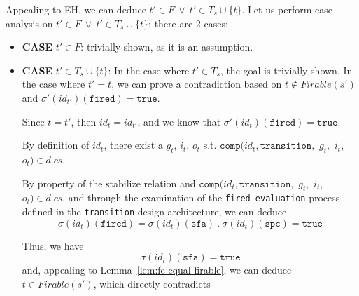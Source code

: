 \documentclass[dvipsnames,12pt]{article}
\begin{document}
\begin{niproof}
\begin{itemize}
\begin{enumerate}
      Appealing to EH, we can deduce $t'\in{}F~\lor~{}t'\in{}T_s\cup\{t\}$.
      Let us perform case analysis on $t'\in{}F~\lor~{}t'\in{}T_s\cup\{t\}$; there are 2 cases:
      \begin{itemize}
      \item \textbf{CASE} $t'\in{}F$: trivially shown, as it is an assumption.
      \item \textbf{CASE} $t'\in{}T_s\cup\{t\}$: In the case where
        $t'\in{}T_s$, the goal is trivially shown. In the case where
        $t'=t$, we can prove a contradiction based on
        $t\notin{}Firable(s')$ and
        $\sigma'(id_{t'})(\texttt{fired})=\mathtt{true}$.

        Since $t=t'$, then $id_t=id_{t'}$, and we know that
        $\sigma'(id_t)(\texttt{fired})=\mathtt{true}$.

        By definition of $id_{t}$, there exist a $g_{t}$, $i_{t}$,
        $o_{t}$ s.t.  $\mathtt{comp}(id_{t},\texttt{transition},$
        $g_{t},$ $i_{t}$, $o_{t})\in{}d.cs$.

        By property of the stabilize relation and
        $\mathtt{comp}(id_{t},\texttt{transition},$ $g_{t},$ $i_{t}$,
        $o_{t})\in{}d.cs$, and through the examination of the
        \texttt{fired_evaluation} process defined in the
        \texttt{transition} design architecture, we can deduce
        \begin{equation*}
          \sigma(id_{t})(\texttt{fired})=\sigma(id_{t})(\texttt{sfa})~.~\sigma(id_{t})(\texttt{spc})=\mathtt{true}
        \end{equation*}
        
        Thus, we have
        \begin{equation*}
          \sigma(id_{t})(\texttt{sfa})=\mathtt{true}
        \end{equation*}
        and, appealing to Lemma~\ref{lem:fe-equal-firable}, we can
        deduce $t\in{}Firable(s')$, which directly contradicts
      \end{itemize}
    \end{enumerate}
    

\end{itemize}
\end{niproof}
\end{document}
